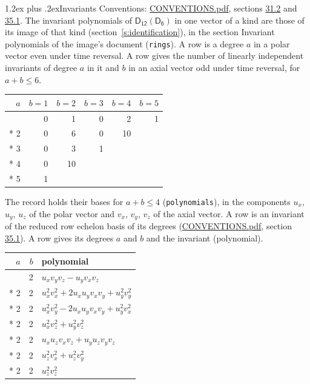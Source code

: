 \documentclass[10pt,a4paper]{article}
\makeatletter
\renewcommand\section{\@startsection{section}{1}{\z@}{-3ex plus -1ex minus -.2ex}%
  {1.2ex plus .2ex}{\normalfont\large\sffamily\bfseries\color{parttitle}}}
\numberwithin{equation}{section}
\newcommand{\grp}[1]{\mathsf{#1}}
\makeatother
\begin{document}
\section{Invariants}\label{s:invariants}
Conventions: \href{../../CONVENTIONS.pdf}{CONVENTIONS.pdf}, sections \href{../../CONVENTIONS.pdf\#conv.31.2}{31.2} and \href{../../CONVENTIONS.pdf\#conv.35.1}{35.1}.
The invariant polynomials of $\grp{D_{12}}(\grp{D_{6}})$ in one vector of a kind are those of its image of that kind (section~\ref{s:identification}), in the section Invariant polynomials of the image's document (\texttt{rings}).
\leavevmode\label{n:index.degree.polar}\label{n:index.degree.axial}A row is a degree $a$ in a polar vector even under time reversal. A row gives the number of linearly independent invariants of degree $a$ in it and $b$ in an axial vector odd under time reversal, for $a + b \le 6$.
{\small\begin{longtable}{@{}rrrrrr@{}}\toprule
$a$ & $b = 1$ & $b = 2$ & $b = 3$ & $b = 4$ & $b = 5$\\\midrule\endhead
\bottomrule\endfoot\endlastfoot
1 & 0 & 1 & 0 & 2 & 1\\*
2 & 0 & 6 & 0 & 10 & \\*
3 & 0 & 3 & 1 &  & \\*
4 & 0 & 10 &  &  & \\*
5 & 1 &  &  &  & \\
\bottomrule\end{longtable}}
\leavevmode\label{n:local.component.polar}\label{n:local.component.axial}The record holds their bases for $a + b \le 4$ (\texttt{polynomials}), in the components $u_{x}$, $u_{y}$, $u_{z}$ of the polar vector and $v_{x}$, $v_{y}$, $v_{z}$ of the axial vector. \label{n:head.polynomial}A row is an invariant of the reduced row echelon basis of its degrees (\href{../../CONVENTIONS.pdf}{CONVENTIONS.pdf}, section \href{../../CONVENTIONS.pdf\#conv.35.1}{35.1}). A row gives its degrees $a$ and $b$ and the invariant (polynomial).
{\small\renewcommand{\arraystretch}{1.2}\begin{longtable}{@{}rrl@{}}\toprule
$a$ & $b$ & polynomial\\\midrule\endhead
\bottomrule\endfoot\endlastfoot
1 & 2 & $u_{x}v_{y}v_{z} - u_{y}v_{x}v_{z}$\\*
2 & 2 & $u_{x}^{2}v_{x}^{2} + 2u_{x}u_{y}v_{x}v_{y} + u_{y}^{2}v_{y}^{2}$\\*
2 & 2 & $u_{x}^{2}v_{y}^{2} - 2u_{x}u_{y}v_{x}v_{y} + u_{y}^{2}v_{x}^{2}$\\*
2 & 2 & $u_{x}^{2}v_{z}^{2} + u_{y}^{2}v_{z}^{2}$\\*
2 & 2 & $u_{x}u_{z}v_{x}v_{z} + u_{y}u_{z}v_{y}v_{z}$\\*
2 & 2 & $u_{z}^{2}v_{x}^{2} + u_{z}^{2}v_{y}^{2}$\\*
2 & 2 & $u_{z}^{2}v_{z}^{2}$\\
\bottomrule\end{longtable}}
\end{document}
